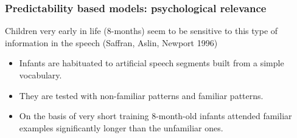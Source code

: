 \begin{frame}
\frametitle{Predictability based models: psychological relevance}

Children very early in life (8-months) seem to be sensitive to this
type of information in the speech (Saffran, Aslin, Newport 1996)

\begin{itemize}
\item Infants are habituated to artificial speech segments built from a simple
    vocabulary.
\item They are tested with non-familiar patterns and familiar
      patterns.
\item On the basis of very short training 8-month-old infants attended
      familiar examples significantly longer than the unfamiliar ones.  
\end{itemize}

\end{frame}
